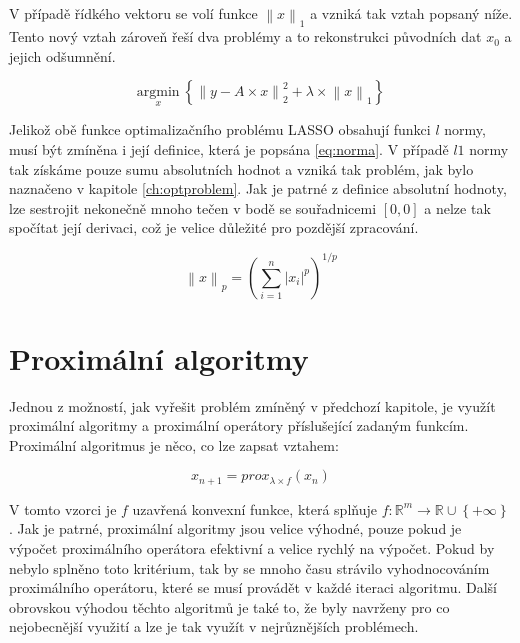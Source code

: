 \documentclass[FM,BP]{tulthesis}
\newcounter{Vzorce}
\begin{document}
V případě řídkého vektoru se volí funkce $\left\|x\right\|_1$ a vzniká tak vztah popsaný níže. Tento nový vztah zároveň řeší dva problémy a to rekonstrukci původních dat $x_0$ a jejich odšumnění.

\begin{equation} \label{eq:Konkretni LASSO} \tag{Vzorec \theVzorce}
\underset{x} {\mathrm{argmin}} ~\left\{\left\|y-A \times x\right\| ^2 _2+ \lambda \times \left\|x\right\|_1\right\}
\end{equation}

Jelikož obě funkce optimalizačního problému LASSO obsahují funkci $l$ normy, musí být zmíněna i její definice, která je popsána \ref{eq:norma}. V případě $l1$ normy tak získáme pouze sumu absolutních hodnot a vzniká tak problém, jak bylo naznačeno v kapitole \ref{ch:optproblem}. Jak je patrné z definice absolutní hodnoty, lze sestrojit nekonečně mnoho tečen v bodě se souřadnicemi $[0, 0]$ a nelze tak spočítat její derivaci, což je velice důležité pro pozdější zpracování.

\begin{equation} \label{eq:norma} \tag{Vzorec \theVzorce}
\left\|x\right\|_p = \left(\sum_{i=1}^{n} \left|x_i\right|^p\right)^{1/p}
\end{equation}

\chapter{Proximální algoritmy}
\label{ch:proxalg}
Jednou z možností, jak vyřešit problém zmíněný v předchozí kapitole, je využít proximální algoritmy a proximální operátory příslušející zadaným funkcím. Proximální algoritmus je něco, co lze zapsat vztahem:

\begin{equation} \label{eq:proxAlg} \tag{Vzorec \theVzorce}
x_{n+1} = prox_{\lambda \times f}(x_{n})
\end{equation}

V tomto vzorci je $f$ uzavřená konvexní funkce, která splňuje $f : \mathbb{R}^{m} \rightarrow \mathbb{R} \cup \left\{+\infty\right\}$. Jak je patrné, proximální algoritmy jsou velice výhodné, pouze pokud je výpočet proximálního operátora efektivní a velice rychlý na výpočet. Pokud by nebylo splněno toto kritérium, tak by se mnoho času strávilo vyhodnocováním proximálního operátoru, které se musí provádět v každé iteraci algoritmu. Další obrovskou výhodou těchto algoritmů je také to, že byly navrženy pro co nejobecnější využití a lze je tak využít v nejrůznějších problémech.
\end{document}
